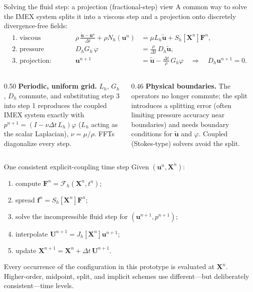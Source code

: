 \documentclass[aspectratio=169,11pt]{beamer}
\newcommand{\uvec}{\bm{u}}
\newcommand{\Xvec}{\bm{X}}
\newcommand{\Fvec}{\bm{F}}
\newcommand{\fvec}{\bm{f}}
\begin{document}
\begin{frame}{Solving the fluid step: a projection (fractional-step) view}
\small
\setlength{\abovedisplayskip}{4pt}\setlength{\belowdisplayskip}{4pt}%
A common way to solve the IMEX system splits it into a viscous step and a projection onto discretely divergence-free fields:
\begin{align*}
  &\text{1. viscous predictor:} &
  \rho\,\frac{\tilde{\uvec}-\uvec^n}{\Delta t}+\rho N_h(\uvec^n)
  &=\mu L_h\tilde{\uvec}+S_h[\Xvec^n]\Fvec^n,\\
  &\text{2. pressure Poisson:} &
  D_hG_h\,\varphi&=\frac{\rho}{\Delta t}\,D_h\tilde{\uvec},\\
  &\text{3. projection:} &
  \uvec^{n+1}&=\tilde{\uvec}-\frac{\Delta t}{\rho}\,G_h\varphi
  \quad\Rightarrow\quad D_h\uvec^{n+1}=0 .
\end{align*}
\begin{columns}[T,onlytextwidth]
\begin{column}{0.50\textwidth}
\textbf{Periodic, uniform grid.} \(L_h\), \(G_h\), \(D_h\) commute, and substituting step 3 into step 1 reproduces the coupled IMEX system exactly with \(p^{n+1}=(I-\nu\Delta t\,L_h)\varphi\) (\(L_h\) acting as the scalar Laplacian), \(\nu=\mu/\rho\). FFTs diagonalize every step.
\end{column}
\begin{column}{0.46\textwidth}
\textbf{Physical boundaries.} The operators no longer commute; the split introduces a splitting error (often limiting pressure accuracy near boundaries) and needs boundary conditions for \(\tilde{\uvec}\) and \(\varphi\). Coupled (Stokes-type) solvers avoid the split.
\end{column}
\end{columns}
\vspace{2pt}
\end{frame}

\begin{frame}{One consistent explicit-coupling time step}
Given $(\uvec^n,\Xvec^n)$:
\begin{enumerate}\itemsep6pt
  \item compute $\Fvec^n=\mathcal{F}_h(\Xvec^n,t^n)$;
  \item spread $\fvec^n=S_h[\Xvec^n]\Fvec^n$;
  \item solve the incompressible fluid step for $(\uvec^{n+1},p^{n+1})$;
  \item interpolate $\bm{U}^{n+1}=J_h[\Xvec^n]\uvec^{n+1}$;
  \item update $\Xvec^{n+1}=\Xvec^n+\Delta t\,\bm{U}^{n+1}$.
\end{enumerate}
\begin{punchbox}
Every occurrence of the configuration in this prototype is evaluated at $\Xvec^n$. Higher-order, midpoint, split, and implicit schemes use different---but deliberately consistent---time levels.
\end{punchbox}
\end{frame}
\end{document}
